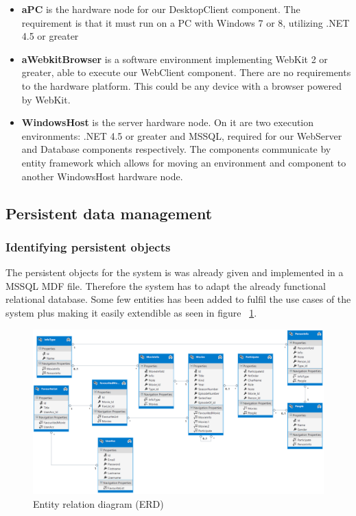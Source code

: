 \begin{itemize}
\item \textbf{aPC} is the hardware node for our DesktopClient component. The requirement is that it must run on a PC with Windows 7 or 8, utilizing .NET 4.5 or greater
\item \textbf{aWebkitBrowser} is a software environment implementing WebKit 2 or greater, able to execute our WebClient component. There are no requirements to the hardware platform. This could be any device with a browser powered by WebKit.
\item \textbf{WindowsHost} is the server hardware node. On it are two execution environments: .NET 4.5 or greater and MSSQL, required for our WebServer and Database components respectively. The components communicate by entity framework which allows for moving an environment and component to another WindowsHost hardware node.
\end{itemize}

\subsection{Persistent data management}
\subsubsection{Identifying persistent objects}
The persistent objects for the system is was already given and implemented in a MSSQL MDF file. Therefore the system has to adapt the already functional relational database. Some few entities has been added to fulfil the use cases of the system plus making it easily extendible as seen in figure ~\ref{fig:ER Diagram}.

\begin{figure}[H]
\includegraphics[width=\linewidth]{img/SDD/ER.png}
\caption{Entity relation diagram (ERD)}
\label{fig:ER Diagram}
\end{figure}

